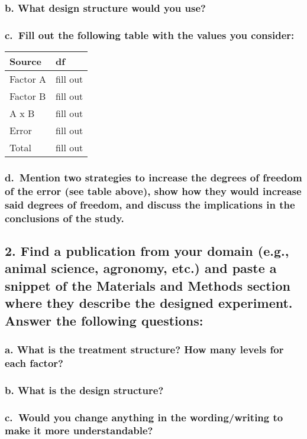 \documentclass[
]{article}
\begin{document}
\subsubsection{b. What design structure would you
use?}\label{b.-what-design-structure-would-you-use}

\subsubsection{c.~Fill out the following table with the values you
consider:}\label{c.-fill-out-the-following-table-with-the-values-you-consider}

\begin{longtable}[]{@{}ll@{}}
\toprule\noalign{}
Source & df \\
\midrule\noalign{}
\endhead
\bottomrule\noalign{}
\endlastfoot
Factor A & fill out \\
Factor B & fill out \\
A x B & fill out \\
Error & fill out \\
Total & fill out \\
\end{longtable}

\subsubsection{d.~Mention two strategies to increase the degrees of
freedom of the error (see table above), show how they would increase
said degrees of freedom, and discuss the implications in the conclusions
of the
study.}\label{d.-mention-two-strategies-to-increase-the-degrees-of-freedom-of-the-error-see-table-above-show-how-they-would-increase-said-degrees-of-freedom-and-discuss-the-implications-in-the-conclusions-of-the-study.}

\subsection{2. Find a publication from your domain (e.g., animal
science, agronomy, etc.) and paste a snippet of the Materials and
Methods section where they describe the designed experiment. Answer the
following
questions:}\label{find-a-publication-from-your-domain-e.g.-animal-science-agronomy-etc.-and-paste-a-snippet-of-the-materials-and-methods-section-where-they-describe-the-designed-experiment.-answer-the-following-questions}

\subsubsection{a. What is the treatment structure? How many levels for
each
factor?}\label{a.-what-is-the-treatment-structure-how-many-levels-for-each-factor}

\subsubsection{b. What is the design
structure?}\label{b.-what-is-the-design-structure}

\subsubsection{c.~Would you change anything in the wording/writing to
make it more
understandable?}\label{c.-would-you-change-anything-in-the-wordingwriting-to-make-it-more-understandable}
\end{document}
